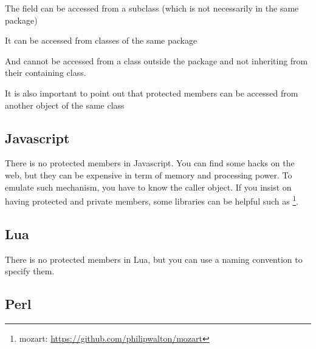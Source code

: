 \documentclass{KodeBook}
\begin{document}


The field can be accessed from a subclass (which is not necessarily in the same package)



It can be accessed from classes of the same package



And cannot be accessed from a class outside the package and not inheriting from their containing class.



It is also important to point out that protected members can be accessed from another object of the same class 



\subsection{Javascript} 

There is no protected members in Javascript. 
You can find some hacks on the web, but they can be expensive in term of memory and processing power.
To emulate such mechanism, you have to know the caller object. 
If you insist on having protected and private members, some libraries can be helpful such as \footnote{mozart: \url{https://github.com/philipwalton/mozart}}.


\subsection{Lua}

There is no protected members in Lua, but you can use a naming convention to specify them.

\subsection{Perl}
\end{document}
